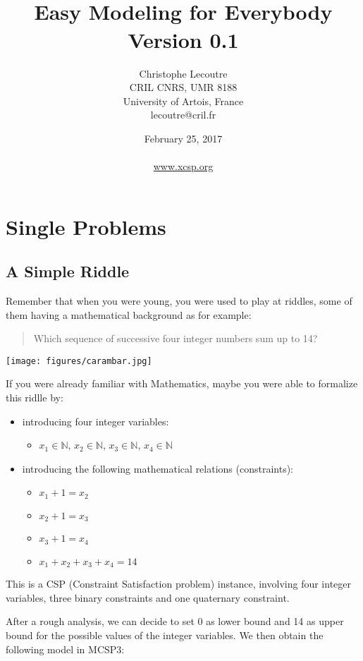 \documentclass[10pt]{article}
\title{\textcolor{dred}{\mt \\ Easy Modeling for Everybody}\\ \textcolor{dred}{{\large Version 0.1}}}
\author{Christophe Lecoutre \\
CRIL CNRS, UMR 8188\\ University of Artois, France \\
lecoutre@cril.fr
}
\date{February 25, 2017\\~ \\\href{www.xcsp.org}{www.xcsp.org}}
\def\N{\mathbb{N}}
\def\mt{{\rm MCSP3}\xspace}
\begin{document}
\maketitle


\section{Single Problems}

\subsection{A Simple Riddle}

Remember that when you were young, you were used to play at riddles, some of them having a mathematical background as for example:
\begin{quote}
Which sequence of successive four integer numbers sum up to 14?
\end{quote}

\begin{center}
  \texttt{[image: figures/carambar.jpg]}
\end{center}

If you were already familiar with Mathematics, maybe you were able to formalize this ridlle by:
\begin{itemize}
\item introducing four integer variables:
\begin{itemize}
  \item $x_1 \in \N$, $x_2 \in \N$, $x_3 \in \N$, $x_4 \in \N$
\end{itemize}
\item introducing the following mathematical relations (constraints):
\begin{itemize}
\item $x_1+1 = x_2$
\item $x_2+1 = x_3$
\item  $x_3+1=x_4$
\item $x_1 + x_2 + x_3 + x_4 = 14$
\end{itemize}
\end{itemize}

This is a CSP (Constraint Satisfaction problem) instance, involving four integer variables, three binary constraints and one quaternary constraint.

After a rough analysis, we can decide to set 0 as lower bound and 14 as upper bound for the possible values of the integer variables.
We then obtain the following model in \mt:
\end{document}
